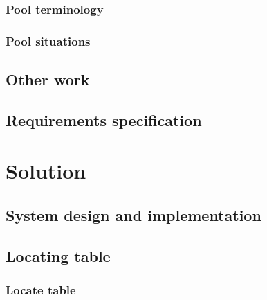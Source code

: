 		\subsection{Pool terminology}
			\label{sec:terminology}
			
	
		\subsection{Pool situations}
			\label{sec:situations}
			
	
		
	\section{Other work}
		\label{sec:otherwork}
		
					
	\section{Requirements specification}
		\label{sec:reqspec}
		

\chapter{Solution}
	\label{solution}
	

	\section{System design and implementation}
		\label{sec:sysdesign}
		
		
	\section{Locating table}
		\label{sec:table-intro}	
			
		
			\subsection{Locate table}
				\label{sec:table-locate}
				
		
		
